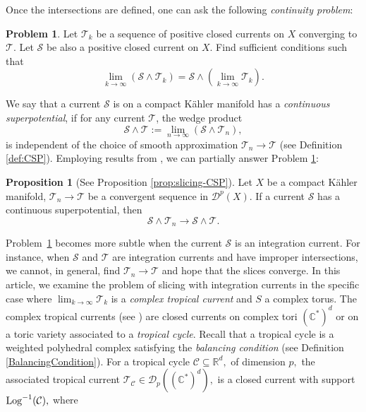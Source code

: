 \documentclass[11pt]{amsart}
\def\Log{{\rm Log}}
\theoremstyle{definition}
\newcommand{\R}{\mathbb{R}}
\newcommand{\lto}{\longrightarrow}
\newcommand{\C}{\mathbb{C}}
\newcommand{\sD}{\mathscr{D}}
\newcommand{\cC}{\mathcal{C}}
\newcommand{\sT}{\mathscr{T}}
\newcommand{\sS}{\mathscr{S}}
\newtheorem{iproblem}[itheorem]{Problem}
\newtheorem{iproposition}[itheorem]{Proposition}
\begin{document}
\vskip 2mm
 Once the intersections are defined, one can ask the following \emph{continuity problem}:
\begin{iproblem}\label{prob:cont}
    Let $\sT_k$ be a sequence of positive closed currents on $X$ converging to $\sT.$  Let $\sS$ be also a positive closed current on $X.$ Find sufficient conditions such that 
    $$
     \lim_{k \to \infty} ( \sS \wedge \sT_k) =  \sS \wedge (\lim_{k\to \infty} \sT_k).
    $$
\end{iproblem}

We say that a current $\sS$ is on a compact K\"ahler manifold has a \emph{continuous superpotential}, if for any current $\sT$, the wedge product
$$
\sS \wedge \sT := \lim_{n \to \infty} (\sS \wedge \sT_n),
$$
is independent of the choice of smooth approximation $\sT_n \lto \sT$ (see Definition \ref{def:CSP}). Employing  results from \cite{Dinh-Sibony:Kahler}, we can partially answer Problem \ref{prob:cont}: 
\begin{iproposition}[See Proposition \ref{prop:slicing-CSP}]\label{iprop:slicing-CSP}
   Let $X$ be a compact K\"ahler manifold, $\sT_n \lto \sT$ be a convergent sequence in $\sD^p(X).$ If a current $\sS$ has a continuous superpotential, then 
    $$
    \sS \wedge \sT_n \lto \sS \wedge \sT. 
    $$
\end{iproposition} 
Problem~\ref{prob:cont} becomes more subtle when the current $\sS$ is an integration current. For instance, when $\sS$ and $\sT$ are integration currents and have improper intersections, we cannot, in general, find $\sT_n\lto \sT$ and hope that the slices converge. 
\vskip 2mm
In this article, we examine the problem of slicing with integration currents in the specific case where $\lim_{k \to \infty} \sT_k$  is a \emph{complex tropical current} and $S$ a complex torus.
The complex tropical currents (see \cite{Babaee, BH}) are closed currents on complex tori $(\C^*)^d$ or on a toric variety associated to a \emph{tropical cycle}. Recall that a tropical cycle is a weighted polyhedral complex satisfying the \emph{balancing condition} (see Definition \ref{BalancingCondition}). For a tropical cycle $\cC \subseteq \R^d,$ of dimension $p,$ the associated tropical current $\sT_{\cC} \in \sD_p((\C^*)^d),$ is a closed current with support $\Log^{-1}(\cC),$ where 
\end{document}
